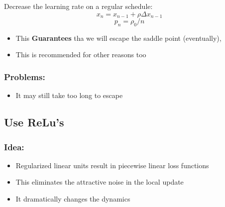 \documentclass[11pt]{article}
\providecommand{\tightlist}{%
      \setlength{\itemsep}{0pt}\setlength{\parskip}{0pt}}
\begin{document}
Decrease the learning rate on a regular schedule:
\[x_n = x_{n-1} +\rho \Delta x_{n-1}\] \[p_n = \rho_0/n\]

\begin{itemize}
\tightlist
\item
  This \textbf{Guarantees} tha we will escape the saddle point
  (eventually),
\item
  This is recommended for other reasons too
\end{itemize}

\hypertarget{problems}{%
\subsubsection{Problems:}\label{problems}}

\begin{itemize}
\tightlist
\item
  It may still take too long to escape
\end{itemize}

    \hypertarget{use-relus}{%
\subsection{Use ReLu's}\label{use-relus}}

\hypertarget{idea}{%
\subsubsection{Idea:}\label{idea}}

\begin{itemize}
\tightlist
\item
  Regularized linear units result in piecewise linear loss functions
\item
  This eliminates the attractive noise in the local update
\item
  It dramatically changes the dynamics
\end{itemize}
\end{document}

